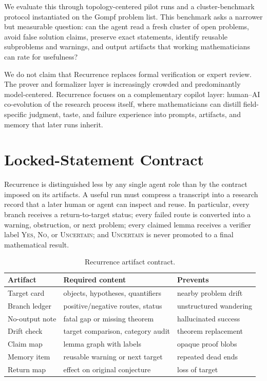 \documentclass{article}
\theoremstyle{definition}
\theoremstyle{remark}
\begin{document}
We evaluate this through topology-centered pilot runs and a cluster-benchmark protocol instantiated on the Gompf problem list. This benchmark asks a narrower but measurable question: can the agent read a fresh cluster of open problems, avoid false solution claims, preserve exact statements, identify reusable subproblems and warnings, and output artifacts that working mathematicians can rate for usefulness?

We do not claim that Recurrence replaces formal verification or expert review. The prover and formalizer layer is increasingly crowded and predominantly model-centered. Recurrence focuses on a complementary copilot layer: human--AI co-evolution of the research process itself, where mathematicians can distill field-specific judgment, taste, and failure experience into prompts, artifacts, and memory that later runs inherit.

\section{Locked-Statement Contract}

Recurrence is distinguished less by any single agent role than by the contract imposed on its artifacts. A useful run must compress a transcript into a research record that a later human or agent can inspect and reuse. In particular, every branch receives a return-to-target status; every failed route is converted into a warning, obstruction, or next problem; every claimed lemma receives a verifier label \textsc{Yes}, \textsc{No}, or \textsc{Uncertain}; and \textsc{Uncertain} is never promoted to a final mathematical result.

\begin{table}[t]
  \caption{Recurrence artifact contract.}
  \label{tab:contract}
  \vskip 0.08in
  \centering
  \begin{footnotesize}
  \setlength{\tabcolsep}{3pt}
  \begin{tabular}{p{}p{}p{}}
    \toprule
    Artifact & Required content & Prevents \\
    \midrule
    Target card & objects, hypotheses, quantifiers & nearby problem drift \\
    Branch ledger & positive/negative routes, status & unstructured wandering \\
    No-output note & fatal gap or missing theorem & hallucinated success \\
    Drift check & target comparison, category audit & theorem replacement \\
    Claim map & lemma graph with labels & opaque proof blobs \\
    Memory item & reusable warning or next target & repeated dead ends \\
    Return map & effect on original conjecture & loss of target \\
    \bottomrule
  \end{tabular}
  \end{footnotesize}
\end{table}
\end{document}
